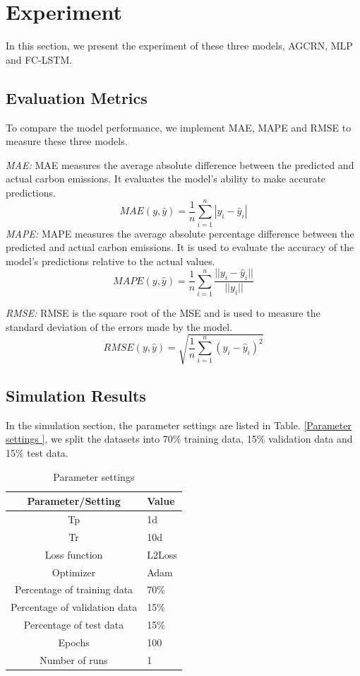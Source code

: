 \documentclass[sigconf, authordraft]{acmart}
\begin{document}
	\section{Experiment}


	In this section, we present the experiment of these three models, AGCRN, MLP and
	FC-LSTM.

	\subsection{Evaluation Metrics }
	To compare the model performance, we implement MAE, MAPE and RMSE to measure these
	three models.

	\emph{MAE:} MAE measures the average absolute difference between the predicted
	and actual carbon emissions. It evaluates the model's ability to make accurate
	predictions.
	\[
		MAE(y, \hat{y}) = \frac{1}{n}\sum_{i=1}^{n}|y_{i}- \hat{y}_{i}|
	\]
	\emph{MAPE:} MAPE measures the average absolute percentage difference between the
	predicted and actual carbon emissions. It is used to evaluate the accuracy of
	the model's predictions relative to the actual values.
	\[
		MAPE(y, \hat{y}) = \frac{1}{n}\sum_{i=1}^{n}\frac{||y_{i}- \hat{y}_{i}||}{||y_{i}||}
	\]

	\emph{RMSE:} RMSE is the square root of the MSE and is used to measure the
	standard deviation of the errors made by the model.
	\[
		RMSE(y, \hat{y}) = \sqrt{\frac{1}{n}\sum_{i=1}^{n}(y_{i}- \hat{y}_{i})^{2}}
	\]
	\subsection{Simulation Results}
	In the simulation section, the parameter settings are listed in Table. \ref{Parameter
	settings
	}, we split the datasets into 70\% training data, 15\% validation data and 15\%
	test data.

	\begin{table}
		\caption{Parameter settings }
		\label{Parameter settings }
		\begin{tabular}{cl}
			\toprule Parameter/Setting    & Value  \\
			\midrule Tp                   & 1d     \\
			Tr                            & 10d    \\
			Loss function                 & L2Loss \\
			Optimizer                     & Adam   \\
			Percentage of training data   & 70\%   \\
			Percentage of validation data & 15\%   \\
			Percentage of test data       & 15\%   \\
			Epochs                        & 100    \\
			Number of runs                & 1      \\
			\bottomrule
		\end{tabular}
	\end{table}
\end{document}
